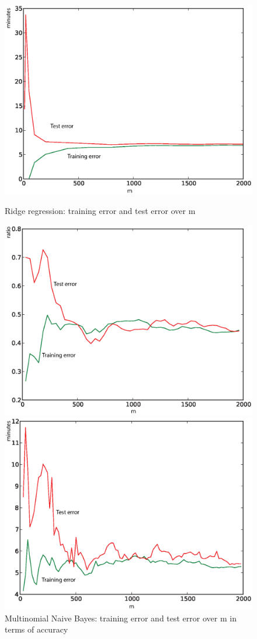 \documentclass[english]{article}
\begin{document}
\begin{figure}[!htb]
  \includegraphics[width=\linewidth]{linreg_tte}
  \caption{Ridge regression: training error and test error over m\\}
\endminipage\hfill
{}
  \includegraphics[width=\linewidth]{nb_tte_accuracy}
  \caption{Multinomial Naive Bayes: training error and test error over m in terms of accuracy}
\endminipage\hfill
{}%
  \includegraphics[width=\linewidth]{nb_tte}

\end{figure}
\end{document}
